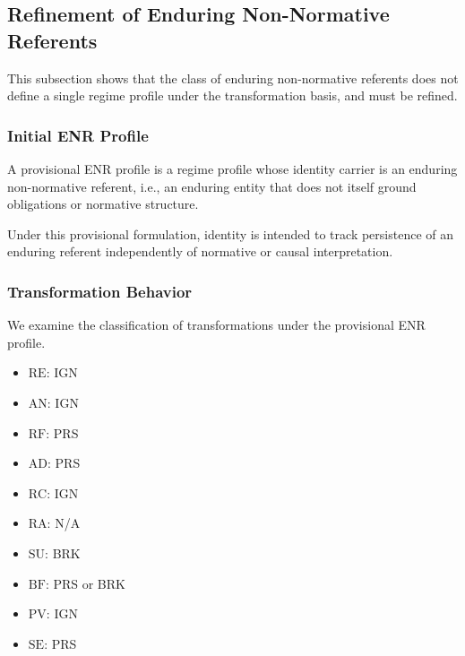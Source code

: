 
\subsection{Refinement of Enduring Non-Normative Referents}
\label{subsec:enr_split}

This subsection shows that the class of enduring non-normative referents
does not define a single regime profile under the transformation basis,
and must be refined.

\subsubsection{Initial ENR Profile}

\begin{definition}
A provisional ENR profile is a regime profile whose identity carrier is an
enduring non-normative referent, i.e., an enduring entity that does not itself
ground obligations or normative structure.
\end{definition}


Under this provisional formulation, identity is intended to track persistence
of an enduring referent independently of normative or causal interpretation.


\subsubsection{Transformation Behavior}

We examine the classification of transformations under the provisional ENR profile.

\begin{itemize}
\item $\mathrm{RE}$: IGN
\item $\mathrm{AN}$: IGN
\item $\mathrm{RF}$: PRS
\item $\mathrm{AD}$: PRS
\item $\mathrm{RC}$: IGN
\item $\mathrm{RA}$: N/A
\item $\mathrm{SU}$: BRK
\item $\mathrm{BF}$: PRS or BRK
\item $\mathrm{PV}$: IGN
\item $\mathrm{SE}$: PRS
\end{itemize}


